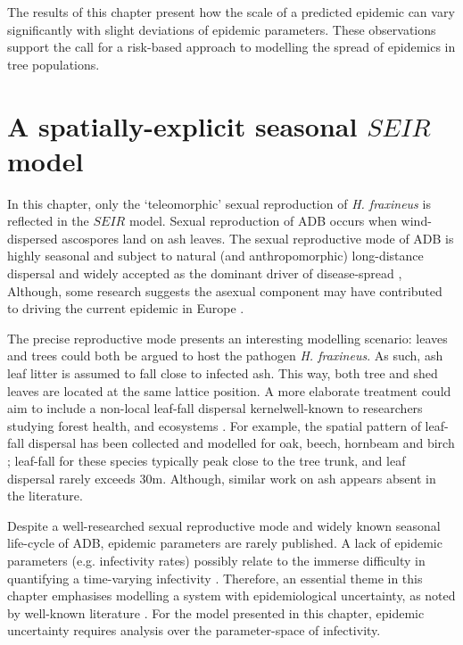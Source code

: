 The results of this chapter present how the scale of a predicted epidemic can vary significantly with slight deviations of epidemic parameters.
These observations support the call for a risk-based approach to modelling the spread of epidemics in tree populations.

\section{A spatially-explicit seasonal $SEIR$ model}
\label{sec:seir-model}

In this chapter, only the `teleomorphic' sexual reproduction of \textit{H. fraxineus} is reflected in the $SEIR$ model.
Sexual reproduction of ADB occurs when wind-dispersed ascospores land on ash leaves.
The sexual reproductive mode of ADB is highly seasonal and subject to natural (and anthropomorphic) long-distance dispersal \cite{grosdidier2018tracking} and 
widely accepted as the dominant driver of disease-spread \cite{https://doi.org/10.1111/ppa.12844, havnavckova2017direct, gross2012reproductive, Timmermann2011elal},
Although, some research suggests the asexual component may have contributed to driving the current epidemic in Europe \cite{fones2016role}.

The precise reproductive mode presents an interesting modelling scenario: leaves and trees could both be argued to host the pathogen \textit{H. fraxineus}.
As such, ash leaf litter is assumed to fall close to infected ash.
This way, both tree and shed leaves are located at the same lattice position.
A more elaborate treatment could aim to include a non-local leaf-fall dispersal kernel\textemdash well-known to researchers studying forest health, and ecosystems \cite{staelens2003model}.
For example, the spatial pattern of leaf-fall dispersal has been collected and modelled for oak, beech, hornbeam and birch \cite{nickmans2019modelling};
leaf-fall for these species typically peak close to the tree trunk, and leaf dispersal rarely exceeds $30\mathrm{m}$.
Although, similar work on ash appears absent in the literature.

Despite a well-researched sexual reproductive mode and widely known seasonal life-cycle of ADB, epidemic parameters are rarely published.
A lack of epidemic parameters (e.g. infectivity rates) possibly relate to the immerse difficulty in quantifying a time-varying infectivity \cite{13-challenges}.
Therefore, an essential theme in this chapter emphasises modelling a system with epidemiological uncertainty, 
as noted by well-known literature \cite{13-challenges, WEBIDEMICS}.
For the model presented in this chapter, epidemic uncertainty requires analysis over the parameter-space of infectivity.

